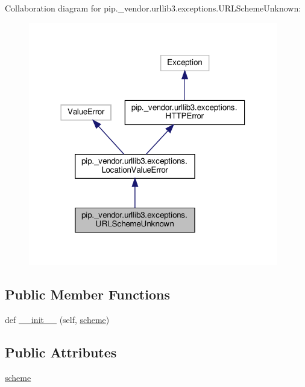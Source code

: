 Collaboration diagram for pip.\+\_\+vendor.\+urllib3.\+exceptions.\+U\+R\+L\+Scheme\+Unknown\+:
\nopagebreak
\begin{figure}[H]
\begin{center}
\leavevmode
\includegraphics[width=309pt]{classpip_1_1__vendor_1_1urllib3_1_1exceptions_1_1URLSchemeUnknown__coll__graph}
\end{center}
\end{figure}
\subsection*{Public Member Functions}
\begin{DoxyCompactItemize}
\item 
def \hyperlink{classpip_1_1__vendor_1_1urllib3_1_1exceptions_1_1URLSchemeUnknown_a0567041a1b36ee571373acafdf6a9483}{\+\_\+\+\_\+init\+\_\+\+\_\+} (self, \hyperlink{classpip_1_1__vendor_1_1urllib3_1_1exceptions_1_1URLSchemeUnknown_ab0b3aaa83326fca7d4fac9550bc79750}{scheme})
\end{DoxyCompactItemize}
\subsection*{Public Attributes}
\begin{DoxyCompactItemize}
\item 
\hyperlink{classpip_1_1__vendor_1_1urllib3_1_1exceptions_1_1URLSchemeUnknown_ab0b3aaa83326fca7d4fac9550bc79750}{scheme}
\end{DoxyCompactItemize}


